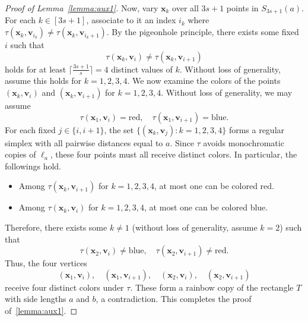\documentclass[10pt,a4paper]{amsart}
\newcommand{\ceil}[1]{\lceil #1\rceil}
\begin{document}
\begin{proof}[Proof of Lemma~\ref{lemma:aux1}]
Now, vary \(\boldsymbol{x}_k\) over all \(3s+1\) points in \(S_{3s+1}(a)\). For each \(k\in [3s+1]\), associate to it an index \(i_k\) where \(\tau(\boldsymbol{x}_k, \boldsymbol{v}_{i_k}) \ne \tau(\boldsymbol{x}_k, \boldsymbol{v}_{i_k+1})\). By the pigeonhole principle, there exists some fixed \(i\) such that
\[
\tau(\boldsymbol{x}_k, \boldsymbol{v}_i) \ne \tau(\boldsymbol{x}_k, \boldsymbol{v}_{i+1})
\]
holds for at least \(\ceil{\frac{3s+1}{s}}=4\) distinct values of \(k\). Without loss of generality, assume this holds for \(k = 1, 2, 3, 4\). We now examine the colors of the points \((\boldsymbol{x}_k, \boldsymbol{v}_i)\) and \((\boldsymbol{x}_k, \boldsymbol{v}_{i+1})\) for \(k = 1, 2, 3, 4\). Without loss of generality, we may assume
\[
\tau(\boldsymbol{x}_1, \boldsymbol{v}_i) = \text{red}, \quad \tau(\boldsymbol{x}_1, \boldsymbol{v}_{i+1}) = \text{blue}.
\]
For each fixed \(j \in \{i, i+1\}\), the set \(\{(\boldsymbol{x}_k, \boldsymbol{v}_j) : k = 1, 2, 3, 4\}\) forms a regular simplex with all pairwise distances equal to \(a\). Since \(\tau\) avoids monochromatic copies of \(\ell_a\), these four points must all receive distinct colors. In particular, the followings hold.
\begin{itemize}
    \item Among \(\tau(\boldsymbol{x}_k, \boldsymbol{v}_{i+1})\) for \(k = 1, 2, 3, 4\), at most one can be colored red.
    \item Among \(\tau(\boldsymbol{x}_k, \boldsymbol{v}_i)\) for \(k = 1, 2, 3, 4\), at most one can be colored blue.
\end{itemize}
Therefore, there exists some \(k \ne 1\) (without loss of generality, assume \(k = 2\)) such that
\[
\tau(\boldsymbol{x}_2, \boldsymbol{v}_i) \ne \text{blue}, \quad \tau(\boldsymbol{x}_2, \boldsymbol{v}_{i+1}) \ne \text{red}.
\]
Thus, the four vertices
\[
(\boldsymbol{x}_1, \boldsymbol{v}_i), \quad (\boldsymbol{x}_1, \boldsymbol{v}_{i+1}), \quad (\boldsymbol{x}_2, \boldsymbol{v}_i), \quad (\boldsymbol{x}_2, \boldsymbol{v}_{i+1})
\]
receive four distinct colors under \(\tau\). These form a rainbow copy of the rectangle \(T\) with side lengths \(a\) and \(b\), a contradiction. This completes the proof of~\cref{lemma:aux1}.
\end{proof}
\end{document}
